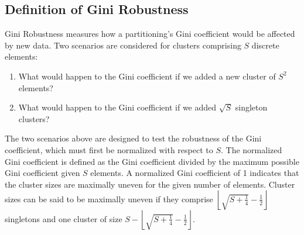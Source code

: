 \documentclass[8pt]{extarticle}
\begin{document}
%
%
%
%
%
%

    \subsection*{Definition of Gini Robustness}

    Gini Robustness measures how a partitioning's Gini coefficient would be affected by new data.
    Two scenarios are considered for clusters comprising $S$ discrete elements:

    \begin{enumerate}
        \item What would happen to the Gini coefficient if we added a new cluster of $S^2$ elements?
        \item What would happen to the Gini coefficient if we added $\sqrt{S} $ singleton clusters?
    \end{enumerate}

    The two scenarios above are designed to test the robustness of the Gini coefficient, which must first be normalized with respect to $S$.
    The normalized Gini coefficient is defined as the Gini coefficient divided by the maximum possible Gini coefficient given $S$ elements.
    A normalized Gini coefficient of 1 indicates that the cluster sizes are maximally uneven for the given number of elements.
    Cluster sizes can be said to be maximally uneven if they comprise $\left\lfloor\sqrt{S+\frac{1}{4}}-\frac{1}{2}\right\rfloor$ singletons and one cluster of size $S - \left\lfloor\sqrt{S+\frac{1}{4}}-\frac{1}{2}\right\rfloor$.
\end{document}
